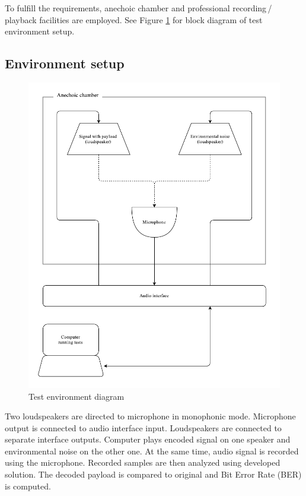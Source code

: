 To fulfill the requirements, anechoic chamber and professional recording\,/\,playback facilities are employed.
See Figure \ref{fig:test-environment} for block diagram of test environment setup.

\clearpage

\subsection{Environment setup}
\begin{figure}[h]
  \includegraphics[width=\linewidth]{figures/experiments/environment}
  \caption{Test environment diagram}
  \label{fig:test-environment}
\end{figure}
Two loudspeakers are directed to microphone in monophonic mode. Microphone output is connected to audio interface input. Loudspeakers are connected to separate
interface outputs. Computer plays encoded signal on one speaker and environmental noise on the other one. At the same time, audio signal is
recorded using the microphone. Recorded samples are then analyzed using developed solution. The decoded payload is compared to original and Bit Error Rate (BER) is computed.

